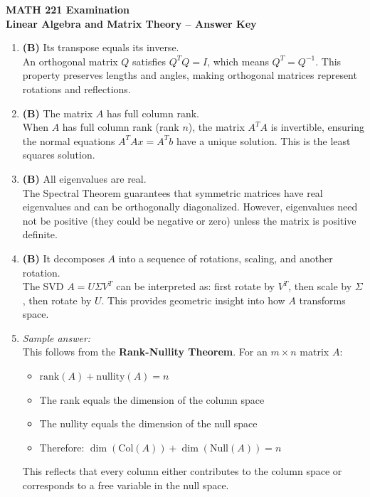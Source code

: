\documentclass[11pt]{article}
\begin{document}
\begin{center}
  {\Large \textbf{MATH 221 Examination}}\\[0.25em]
  {\large \textbf{Linear Algebra and Matrix Theory -- Answer Key}}\\[0.5em]
\end{center}

\begin{enumerate}[label=\textbf{\arabic*.}]

  \item \textbf{(B)} Its transpose equals its inverse.\\
  An orthogonal matrix $Q$ satisfies $Q^T Q = I$, which means $Q^T = Q^{-1}$. This property 
  preserves lengths and angles, making orthogonal matrices represent rotations and reflections.

  \item \textbf{(B)} The matrix $A$ has full column rank.\\
  When $A$ has full column rank (rank $n$), the matrix $A^T A$ is invertible, ensuring the 
  normal equations $A^T A x = A^T b$ have a unique solution. This is the least squares solution.

  \item \textbf{(B)} All eigenvalues are real.\\
  The Spectral Theorem guarantees that symmetric matrices have real eigenvalues and can be 
  orthogonally diagonalized. However, eigenvalues need not be positive (they could be negative 
  or zero) unless the matrix is positive definite.

  \item \textbf{(B)} It decomposes $A$ into a sequence of rotations, scaling, and another rotation.\\
  The SVD $A = U\Sigma V^T$ can be interpreted as: first rotate by $V^T$, then scale by 
  $\Sigma$, then rotate by $U$. This provides geometric insight into how $A$ transforms space.

  \item \emph{Sample answer:}\\
  This follows from the \textbf{Rank-Nullity Theorem}. For an $m \times n$ matrix $A$:
  \begin{itemize}
    \item $\text{rank}(A) + \text{nullity}(A) = n$
    \item The rank equals the dimension of the column space
    \item The nullity equals the dimension of the null space
    \item Therefore: $\dim(\text{Col}(A)) + \dim(\text{Null}(A)) = n$
  \end{itemize}
  This reflects that every column either contributes to the column space or corresponds to 
  a free variable in the null space.


\end{enumerate}
\end{document}
